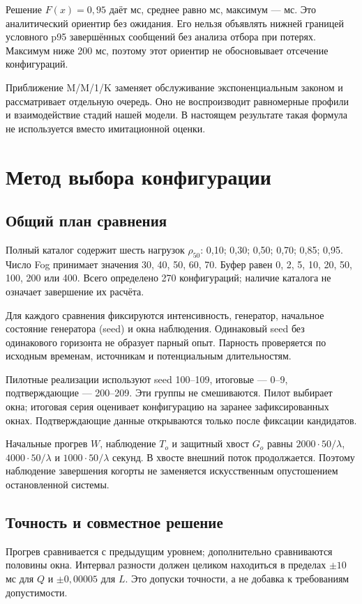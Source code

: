\documentclass{psta}
\begin{document}
Решение $F(x)=0{,}95$ даёт \dServiceQ{} мс, среднее равно \dServiceMean{} мс, максимум --- \dServiceMax{} мс. Это аналитический ориентир без ожидания. Его нельзя объявлять нижней границей условного p95 завершённых сообщений без анализа отбора при потерях. Максимум ниже 200 мс, поэтому этот ориентир не обосновывает отсечение конфигураций.

Приближение M/M/1/K заменяет обслуживание экспоненциальным законом и рассматривает отдельную очередь. Оно не воспроизводит равномерные профили и взаимодействие стадий нашей модели. В настоящем результате такая формула не используется вместо имитационной оценки.

\section{Метод выбора конфигурации}\label{sec:method}
\subsection{Общий план сравнения}
Полный каталог содержит шесть нагрузок $\rho_{50}$: 0,10; 0,30; 0,50; 0,70; 0,85; 0,95. Число Fog принимает значения 30, 40, 50, 60, 70. Буфер равен 0, 2, 5, 10, 20, 50, 100, 200 или 400. Всего определено 270 конфигураций; наличие каталога не означает завершение их расчёта.

Для каждого сравнения фиксируются интенсивность, генератор, начальное состояние генератора (seed) и окна наблюдения. Одинаковый seed без одинакового горизонта не образует парный опыт. Парность проверяется по исходным временам, источникам и потенциальным длительностям.

Пилотные реализации используют seed 100--109, итоговые --- 0--9, подтверждающие --- 200--209. Эти группы не смешиваются. Пилот выбирает окна; итоговая серия оценивает конфигурацию на заранее зафиксированных окнах. Подтверждающие данные открываются только после фиксации кандидатов.

Начальные прогрев $W$, наблюдение $T_o$ и защитный хвост $G_o$ равны $2000\cdot50/\lambda$, $4000\cdot50/\lambda$ и $1000\cdot50/\lambda$ секунд. В хвосте внешний поток продолжается. Поэтому наблюдение завершения когорты не заменяется искусственным опустошением остановленной системы.

\subsection{Точность и совместное решение}
Прогрев сравнивается с предыдущим уровнем; дополнительно сравниваются половины окна. Интервал разности должен целиком находиться в пределах $\pm10$ мс для $Q$ и $\pm0{,}00005$ для $L$. Это допуски точности, а не добавка к требованиям допустимости.
\end{document}
